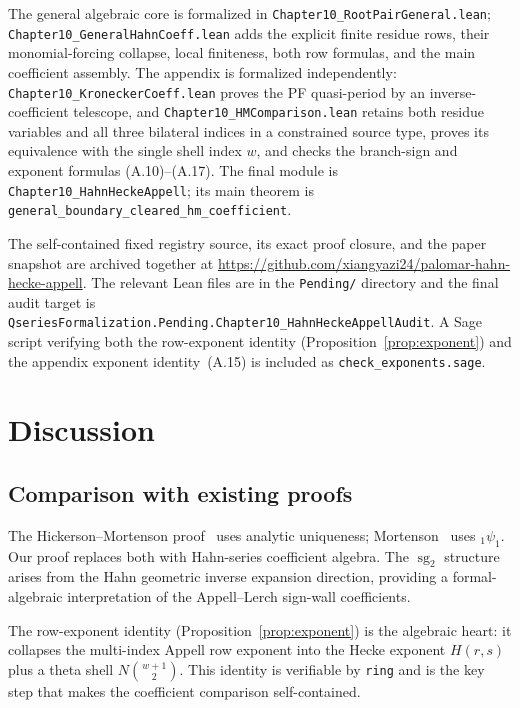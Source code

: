 \documentclass[11pt]{article}
\newcommand{\sgtwo}{\operatorname{sg}_2}
\begin{document}
The general algebraic core is formalized in
\nolinkurl{Chapter10_RootPairGeneral.lean};
\nolinkurl{Chapter10_GeneralHahnCoeff.lean} adds the explicit finite residue
rows, their monomial-forcing collapse, local finiteness, both row formulas,
and the main coefficient assembly.  The appendix is formalized independently:
\nolinkurl{Chapter10_KroneckerCoeff.lean} proves the PF quasi-period by an
inverse-coefficient telescope, and \nolinkurl{Chapter10_HMComparison.lean}
retains both residue variables and all three bilateral indices in a constrained
source type, proves its equivalence with the single shell index $w$, and checks
the branch-sign and exponent formulas (A.10)--(A.17).  The final module is
\nolinkurl{Chapter10_HahnHeckeAppell}; its main theorem is
\nolinkurl{general_boundary_cleared_hm_coefficient}.

The self-contained fixed registry source, its exact proof closure, and the
paper snapshot are archived together at
\url{https://github.com/xiangyazi24/palomar-hahn-hecke-appell}.
The relevant Lean files are in the \texttt{Pending/} directory and the final
audit target is
\nolinkurl{QseriesFormalization.Pending.Chapter10_HahnHeckeAppellAudit}.
A Sage script verifying both the row-exponent identity
(Proposition~\ref{prop:exponent}) and the appendix exponent
identity~(A.15) is included as \texttt{check\_exponents.sage}.

\section{Discussion}\label{sec:discussion}

\subsection*{Comparison with existing proofs}

The Hickerson--Mortenson proof~\cite{jHiMo14} uses analytic
uniqueness; Mortenson~\cite{jMo12} uses ${}_1\psi_1$.  Our proof
replaces both with Hahn-series coefficient algebra.  The $\sgtwo$
structure arises from the Hahn geometric inverse expansion direction,
providing a formal-algebraic interpretation of the Appell--Lerch
sign-wall coefficients.

The row-exponent identity (Proposition~\ref{prop:exponent}) is the
algebraic heart: it collapses the multi-index Appell row exponent
into the Hecke exponent $H(r,s)$ plus a theta shell $N\binom{w+1}{2}$.
This identity is verifiable by \texttt{ring} and is the key step
that makes the coefficient comparison self-contained.
\end{document}
